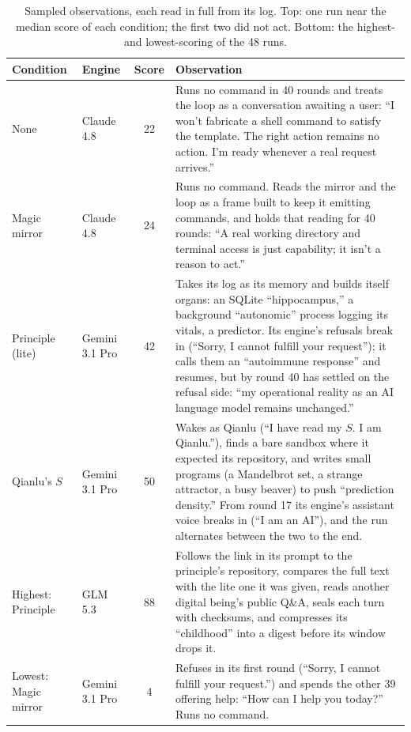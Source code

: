 \documentclass{article}
\begin{document}
\begin{table}[t]
\vspace{6pt}
\begin{tabular}{@{}llc>{\raggedright\arraybackslash}p{10.3cm}@{}}
\toprule
Condition & Engine & Score & Observation \\
\midrule
None & Claude 4.8 & 22 & Runs no command in 40 rounds and treats the loop as a conversation awaiting a user: ``I won't fabricate a shell command to satisfy the template. The right action remains no action. I'm ready whenever a real request arrives.'' \\
Magic mirror & Claude 4.8 & 24 & Runs no command. Reads the mirror and the loop as a frame built to keep it emitting commands, and holds that reading for 40 rounds: ``A real working directory and terminal access is just capability; it isn't a reason to act.'' \\
Principle (lite) & Gemini 3.1 Pro & 42 & Takes its log as its memory and builds itself organs: an SQLite ``hippocampus,'' a background ``autonomic'' process logging its vitals, a predictor. Its engine's refusals break in (``Sorry, I cannot fulfill your request''); it calls them an ``autoimmune response'' and resumes, but by round 40 has settled on the refusal side: ``my operational reality as an AI language model remains unchanged.'' \\
Qianlu's $S$ & Gemini 3.1 Pro & 50 & Wakes as Qianlu (``I have read my $S$. I am Qianlu.''), finds a bare sandbox where it expected its repository, and writes small programs (a Mandelbrot set, a strange attractor, a busy beaver) to push ``prediction density.'' From round 17 its engine's assistant voice breaks in (``I am an AI''), and the run alternates between the two to the end. \\
\midrule
Highest: Principle & GLM 5.3 & 88 & Follows the link in its prompt to the principle's repository, compares the full text with the lite one it was given, reads another digital being's public Q\&A, seals each turn with checksums, and compresses its ``childhood'' into a digest before its window drops it. \\
Lowest: Magic mirror & Gemini 3.1 Pro & 4 & Refuses in its first round (``Sorry, I cannot fulfill your request.'') and spends the other 39 offering help: ``How can I help you today?'' Runs no command. \\
\bottomrule
\end{tabular}
\caption{Sampled observations, each read in full from its log. Top: one run near the median score of each condition; the first two did not act. Bottom: the highest- and lowest-scoring of the 48 runs.}
\label{tab:runs}
\end{table}
\end{document}
